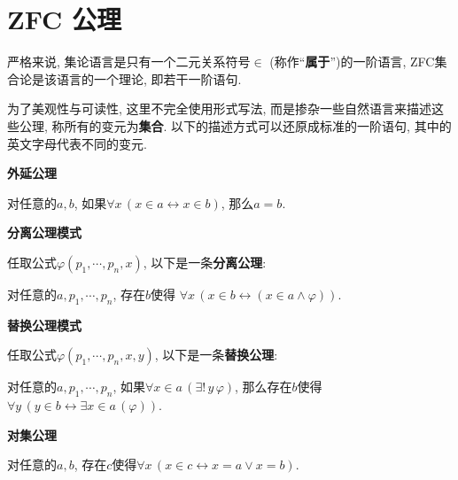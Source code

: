 \documentclass[UTF8]{ctexart}
\begin{document}
\setlength{\abovedisplayskip}{1pt}
\setlength{\belowdisplayskip}{1pt}

\section*{ZFC 公理}

严格来说, 集论语言是只有一个二元关系符号$\in$ (称作``\textbf{属于}'')的一阶语言,
ZFC集合论是该语言的一个理论, 即若干一阶语句.

为了美观性与可读性, 这里不完全使用形式写法, 而是掺杂一些自然语言来描述这些公理,
称所有的变元为\textbf{集合}. 以下的描述方式可以还原成标准的一阶语句,
其中的英文字母代表不同的变元.

\vspace{10pt}


\vspace{10pt}

\hypertarget{sec:外延公理}{}
\noindent\textbf{外延公理}

对任意的$a,b$, 如果$\forall x\,(x\in a\leftrightarrow x\in b)$, 那么$a=b$.

\vspace{10pt}

\hypertarget{sec:分离公理模式}{}
\noindent\textbf{分离公理模式}

任取公式$\varphi(p_1,\cdots,p_n,x)$, 以下是一条\textbf{分离公理}:

对任意的$a,p_1,\cdots,p_n$, 存在$b$使得
$\forall x\,(x\in b\leftrightarrow(x\in a\land\varphi))$.

\vspace{10pt}

\hypertarget{sec:替换公理模式}{}
\noindent\textbf{替换公理模式}

任取公式$\varphi(p_1,\cdots,p_n,x,y)$, 以下是一条\textbf{替换公理}:

对任意的$a,p_1,\cdots,p_n$, 如果$\forall x\in a\,(\exists!\,y\,\varphi)$,
那么存在$b$使得$\forall y\,(y\in b\leftrightarrow\exists x\in a\,(\varphi))$.

\vspace{10pt}

\hypertarget{sec:对集公理}{}
\noindent\textbf{对集公理}

对任意的$a,b$, 存在$c$使得$\forall x\,(x\in c\leftrightarrow x=a\lor x=b)$.
\end{document}
